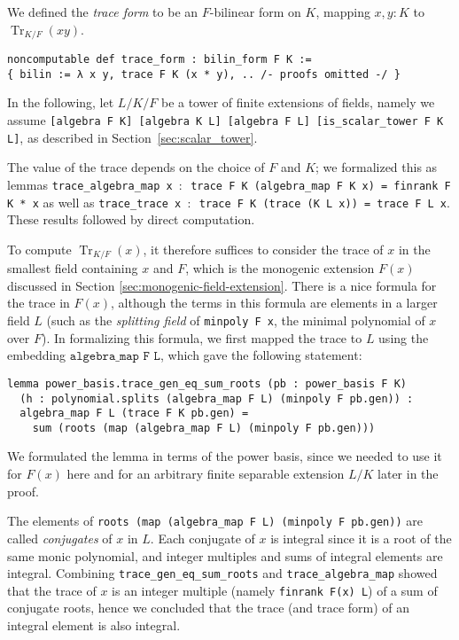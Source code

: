 \documentclass[sn-mathphys]{sn-jnl}%
\newcommand{\lean}[1]{\texttt{#1}\xspace}
\DeclareMathOperator{\Tr}{Tr}
\begin{document}
We defined the \emph{trace form} to be an $F$-bilinear form on $K$, mapping $x, y : K$ to $\Tr_{K/F}(xy)$.
\begin{lstlisting}
noncomputable def trace_form : bilin_form F K :=
{ bilin := λ x y, trace F K (x * y), .. /- proofs omitted -/ }
\end{lstlisting}

In the following, let $L / K / F$ be a tower of finite extensions of fields, namely we assume \lean{[algebra F K] [algebra K L] [algebra F L] [is\_scalar\_tower F K L]}, as described in Section~\ref{sec:scalar_tower}.

The value of the trace depends on the choice of $F$ and $K$; we formalized this as lemmas \lean{trace\_algebra\_map x $:$ trace F K (algebra\_map F K x) = finrank F K * x} as well as \lean{trace\_trace x $:$ trace F K (trace (K L x)) = trace F L x}.
These results followed by direct computation.

To compute $\Tr_{K/F}(x)$, it therefore suffices to consider the trace of $x$ in the smallest field containing $x$ and $F$, which is the monogenic extension $F(x)$ discussed in Section \ref{sec:monogenic-field-extension}.
There is a nice formula for the trace in $F(x)$, although the terms in this formula are elements in a larger field $L$
(such as the \emph{splitting field} of \lean{minpoly F x}, the minimal polynomial of $x$ over $F$).
In formalizing this formula, we first mapped the trace to $L$ using the embedding $\lean{algebra\_map F L}$,
which gave the following statement:
\begin{lstlisting}
lemma power_basis.trace_gen_eq_sum_roots (pb : power_basis F K)
  (h : polynomial.splits (algebra_map F L) (minpoly F pb.gen)) :
  algebra_map F L (trace F K pb.gen) =
    sum (roots (map (algebra_map F L) (minpoly F pb.gen)))
\end{lstlisting}
We formulated the lemma in terms of the power basis, since we needed to use it for $F(x)$ here
and for an arbitrary finite separable extension $L / K$ later in the proof.

The elements of \lean{roots (map (algebra\_map F L) (minpoly F pb.gen))} are called \emph{conjugates} of $x$ in $L$.
Each conjugate of $x$ is integral since it is a root of the same monic polynomial,
and integer multiples and sums of integral elements are integral.
Combining \lean{trace\_gen\_eq\_sum\_roots} and \lean{trace\_algebra\_map} showed that the trace of $x$ is an integer multiple (namely \lean{finrank F(x) L}) of a sum of conjugate roots, hence we concluded that the trace (and trace form) of an integral element is also integral.
\end{document}

